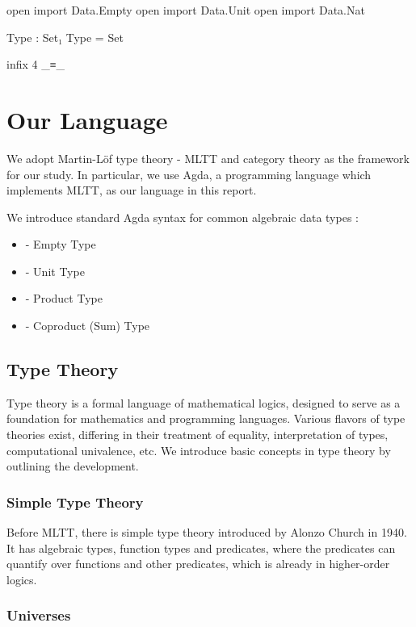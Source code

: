 \begin{code}[hide]
open import Data.Empty
open import Data.Unit
open import Data.Nat

Type : Set₁
Type = Set

infix  4 _≡_
\end{code}

\section{Our Language}

We adopt Martin-L\"{o}f type theory - MLTT and category theory as the framework for our study. In particular, we use Agda, a programming language which implements MLTT, as our language in this report.

We introduce standard Agda syntax for common algebraic data types :
\begin{itemize}
  \item{ - Empty Type}
  \item{ - Unit Type}
  \item{ - Product Type}
  \item{ - Coproduct (Sum) Type}
\end{itemize}

\subsection{Type Theory}

Type theory is a formal language of mathematical logics, designed to serve as a foundation for mathematics and programming languages. Various flavors of type theories exist, differing in their treatment of equality, interpretation of types, computational univalence, etc. We introduce basic concepts in type theory by outlining the development.

\subsubsection*{Simple Type Theory}

Before MLTT, there is simple type theory introduced by Alonzo Church in 1940. It has algebraic types, function types and predicates, where the predicates can quantify over functions and other predicates, which is already in higher-order logics.

\subsubsection*{Universes}

